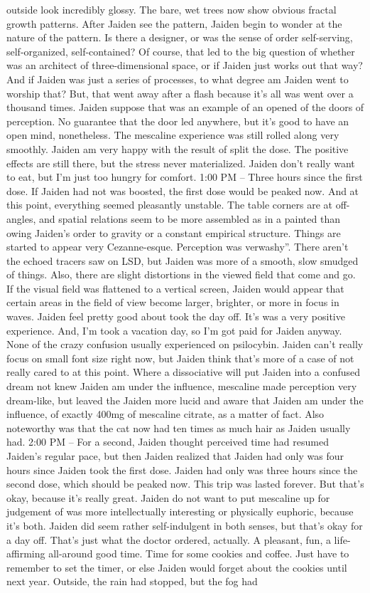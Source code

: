 \documentclass[12pt]{book}
\begin{document}
outside look incredibly glossy. The bare, wet trees now show obvious fractal growth patterns. After Jaiden see the pattern, Jaiden begin to wonder at the nature of the pattern. Is there a designer, or was the sense of order self-serving, self-organized, self-contained? Of course, that led to the big question of whether was an architect of three-dimensional space, or if Jaiden just works out that way? And if Jaiden was just a series of processes, to what degree am Jaiden went to worship that? But, that went away after a flash because it's all was went over a thousand times. Jaiden suppose that was an example of an opened of the doors of perception. No guarantee that the door led anywhere, but it's good to have an open mind, nonetheless. The mescaline experience was still rolled along very smoothly. Jaiden am very happy with the result of split the dose. The positive effects are still there, but the stress never materialized. Jaiden don't really want to eat, but I'm just too hungry for comfort. 1:00 PM -- Three hours since the first dose. If Jaiden had not was boosted, the first dose would be peaked now. And at this point, everything seemed pleasantly unstable. The table corners are at off-angles, and spatial relations seem to be more assembled as in a painted than owing Jaiden's order to gravity or a constant empirical structure. Things are started to appear very Cezanne-esque. Perception was verwashy''. There aren't the echoed tracers saw on LSD, but Jaiden was more of a smooth, slow smudged of things. Also, there are slight distortions in the viewed field that come and go. If the visual field was flattened to a vertical screen, Jaiden would appear that certain areas in the field of view become larger, brighter, or more in focus in waves. Jaiden feel pretty good about took the day off. It's was a very positive experience. And, I'm took a vacation day, so I'm got paid for Jaiden anyway. None of the crazy confusion usually experienced on psilocybin. Jaiden can't really focus on small font size right now, but Jaiden think that's more of a case of not really cared to at this point. Where a dissociative will put Jaiden into a confused dream not knew Jaiden am under the influence, mescaline made perception very dream-like, but leaved the Jaiden more lucid and aware that Jaiden am under the influence, of exactly 400mg of mescaline citrate, as a matter of fact. Also noteworthy was that the cat now had ten times as much hair as Jaiden usually had. 2:00 PM -- For a second, Jaiden thought perceived time had resumed Jaiden's regular pace, but then Jaiden realized that Jaiden had only was four hours since Jaiden took the first dose. Jaiden had only was three hours since the second dose, which should be peaked now. This trip was lasted forever. But that's okay, because it's really great. Jaiden do not want to put mescaline up for judgement of was more intellectually interesting or physically euphoric, because it's both. Jaiden did seem rather self-indulgent in both senses, but that's okay for a day off. That's just what the doctor ordered, actually. A pleasant, fun, a life-affirming all-around good time. Time for some cookies and coffee. Just have to remember to set the timer, or else Jaiden would forget about the cookies until next year. Outside, the rain had stopped, but the fog had 
\end{document}

